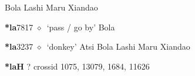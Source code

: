 \begin{list}{}{\leftmargin=1.5em \itemindent=-1.5em}
         Bola 
\hspace{1ex}
         Lashi 
\hspace{1ex}
         Maru 
\hspace{1ex}
         Xiandao 
  \item {\footnotesize \textbf{*la}}{\tiny 7817}
\hspace{1ex}
         $\diamond$~`pass / go by'
         Bola 
  \item {\footnotesize \textbf{*la}}{\tiny 3237}
\hspace{1ex}
         $\diamond$~`donkey'
         Atsi 
\hspace{1ex}
         Bola 
\hspace{1ex}
         Lashi 
\hspace{1ex}
         Maru 
\hspace{1ex}
         Xiandao 
  \end{list}
\item
\textbf{*laH}
?
  {\tiny crossid 1075, 13079, 1684, 11626}
